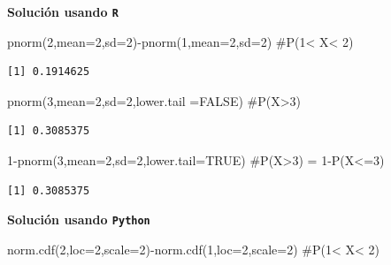 \documentclass[
  letterpaper,
  DIV=11,
  numbers=noendperiod]{scrreprt}
\newenvironment{Shaded}{\begin{snugshade}}{\end{snugshade}}
\newcommand{\AttributeTok}[1]{\textcolor[rgb]{0.40,0.45,0.13}{#1}}
\newcommand{\CommentTok}[1]{\textcolor[rgb]{0.37,0.37,0.37}{#1}}
\newcommand{\ConstantTok}[1]{\textcolor[rgb]{0.56,0.35,0.01}{#1}}
\newcommand{\DecValTok}[1]{\textcolor[rgb]{0.68,0.00,0.00}{#1}}
\newcommand{\FunctionTok}[1]{\textcolor[rgb]{0.28,0.35,0.67}{#1}}
\newcommand{\NormalTok}[1]{\textcolor[rgb]{0.00,0.23,0.31}{#1}}
\newcommand{\OperatorTok}[1]{\textcolor[rgb]{0.37,0.37,0.37}{#1}}
\newcommand{\SpecialCharTok}[1]{\textcolor[rgb]{0.37,0.37,0.37}{#1}}
\begin{document}
\textbf{Solución usando \texttt{R}}

\begin{Shaded}
\begin{Highlighting}[]
\FunctionTok{pnorm}\NormalTok{(}\DecValTok{2}\NormalTok{,}\AttributeTok{mean=}\DecValTok{2}\NormalTok{,}\AttributeTok{sd=}\DecValTok{2}\NormalTok{)}\SpecialCharTok{{-}}\FunctionTok{pnorm}\NormalTok{(}\DecValTok{1}\NormalTok{,}\AttributeTok{mean=}\DecValTok{2}\NormalTok{,}\AttributeTok{sd=}\DecValTok{2}\NormalTok{) }\CommentTok{\#P(1\textless{} X\textless{} 2)}
\end{Highlighting}
\end{Shaded}

\begin{verbatim}
[1] 0.1914625
\end{verbatim}

\begin{Shaded}
\begin{Highlighting}[]
\FunctionTok{pnorm}\NormalTok{(}\DecValTok{3}\NormalTok{,}\AttributeTok{mean=}\DecValTok{2}\NormalTok{,}\AttributeTok{sd=}\DecValTok{2}\NormalTok{,}\AttributeTok{lower.tail =}\ConstantTok{FALSE}\NormalTok{) }\CommentTok{\#P(X\textgreater{}3)}
\end{Highlighting}
\end{Shaded}

\begin{verbatim}
[1] 0.3085375
\end{verbatim}

\begin{Shaded}
\begin{Highlighting}[]
\DecValTok{1}\SpecialCharTok{{-}}\FunctionTok{pnorm}\NormalTok{(}\DecValTok{3}\NormalTok{,}\AttributeTok{mean=}\DecValTok{2}\NormalTok{,}\AttributeTok{sd=}\DecValTok{2}\NormalTok{,}\AttributeTok{lower.tail=}\ConstantTok{TRUE}\NormalTok{) }\CommentTok{\#P(X\textgreater{}3) = 1{-}P(X\textless{}=3)}
\end{Highlighting}
\end{Shaded}

\begin{verbatim}
[1] 0.3085375
\end{verbatim}

\textbf{Solución usando \texttt{Python}}

\begin{Shaded}
\begin{Highlighting}[]
\NormalTok{norm.cdf(}\DecValTok{2}\NormalTok{,loc}\OperatorTok{=}\DecValTok{2}\NormalTok{,scale}\OperatorTok{=}\DecValTok{2}\NormalTok{)}\OperatorTok{{-}}\NormalTok{norm.cdf(}\DecValTok{1}\NormalTok{,loc}\OperatorTok{=}\DecValTok{2}\NormalTok{,scale}\OperatorTok{=}\DecValTok{2}\NormalTok{) }\CommentTok{\#P(1\textless{} X\textless{} 2)}
\end{Highlighting}
\end{Shaded}
\end{document}
